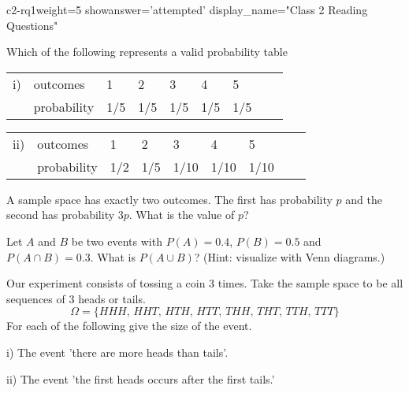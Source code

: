 \begin{edXproblem}{c2-rq1}{weight=5  showanswer='attempted' display_name="Class 2 Reading Questions" }

Which of the following represents a valid probability table 

\begin{tabular}{ll|lllllll}
i) & outcomes & 1 &2 &3 &4 &5 \\
\cline{2-7}
&probability &1/5 &1/5 &1/5 &1/5 &1/5
\end{tabular}

\bigskip

\begin{tabular}{ll|lllllll}
ii) & outcomes & 1 &2 &3 &4 &5 \\
\cline{2-7}
&probability &1/2 &1/5 &1/10 &1/10 &1/10
\end{tabular}


A sample space has exactly two outcomes. The first has probability $p$
and the second has probability $3p$. What is the value of $p$?


Let $A$ and $B$ be two events with $P(A) = 0.4$, $P(B) = 0.5$ and 
$P(A\cap B) = 0.3$. What is $P(A \cup B)$?
(Hint: visualize with Venn diagrams.)


Our experiment consists of tossing a coin 3 times. Take the sample space
to be all sequences of 3 heads or tails.
\[ \Omega = \{HHH,\,HHT,\,HTH,\,HTT,\,THH,\,THT,\,TTH,\,TTT\}
\]
For each of the following give the size of the event.

i) The event 'there are more heads than tails'.


ii) The event 'the first heads occurs after the first tails.'



\end{edXproblem}

